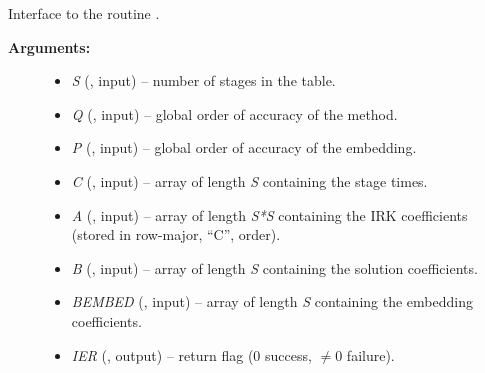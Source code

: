 \documentclass[letterpaper,10pt,english]{sphinxmanual}
\begin{document}
\begin{fulllineitems}
\label{f_interface/Usage:f/_/FARKSETIRKTABLE}
Interface to the routine {\hyperref[c_interface/User_callable:c.ARKodeSetIRKTable]{\emph{}}}.
\begin{description}
\item[{\textbf{Arguments:}}] \leavevmode\begin{itemize}
\item {} 
\emph{S} (, input) -- number of stages in the table.

\item {} 
\emph{Q} (, input) -- global order of accuracy of the method.

\item {} 
\emph{P} (, input) -- global order of accuracy of the embedding.

\item {} 
\emph{C} (, input) -- array of length \emph{S} containing the stage times.

\item {} 
\emph{A} (, input) -- array of length \emph{S*S} containing the IRK coefficients
(stored in row-major, ``C'', order).

\item {} 
\emph{B} (, input) -- array of length \emph{S} containing the solution coefficients.

\item {} 
\emph{BEMBED} (, input) -- array of length \emph{S} containing the embedding
coefficients.

\item {} 
\emph{IER} (, output) -- return flag (0 success, \(\ne 0\) failure).

\end{itemize}

\end{description}

\end{fulllineitems}

\end{document}
